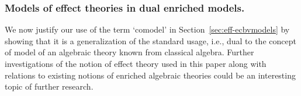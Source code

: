 \documentclass{LMCS}
\newcommand{\hide}[1]{}
\newcommand{\ECBV}{ECBV}
\newcommand{\ECBVS}[1]{\mathrm{ECBV}_{#1}^{\states}}
\newcommand{\VCat}{\fixedcatfont{V}} \newcommand{\CCat}{\fixedcatfont{C}} \newcommand{\DCat}{\fixedcatfont{D}}
\newcommand{\fixedcatfont}{\mathbf}
\newcommand{\denlb}{[\![}
\newcommand{\denrb}{]\!]}
\newcommand{\den}[1]{\denlb{#1}\denrb}
\newcommand{\stateobj}{{\underline{S}}}
\newcommand{\states}{{\underline{\mathrm{S}}}}
\newcommand{\enrmodel}{enriched call-by-value model}
\begin{document}
\hide{\begin{prop}
Let  $(\VCat,\CCat, \stateobj)$ be an {\enrmodel} with a chosen state object, and let $E$ be an effect theory. The interpretation of {\ECBV} in $(\VCat,\CCat)$ extends to a sound interpretation of $\ECBVS{E}$ with $\den\states = \stateobj$ iff $\stateobj$ carries a comodel structure for $E$.
\end{prop}}


\subsubsection{Models of effect theories in dual enriched models.}
\label{sec:eff-cpsmodels}

We now justify our use of the term `comodel' in Section~\ref{sec:eff-ecbvmodels}
by showing that it is a generalization of the standard usage, i.e., dual to the concept of 
model of an algebraic theory known from classical algebra. 
Further investigations of the notion of effect theory used in this 
paper along with relations to existing notions of enriched algebraic 
theories \cite{kp-enrichedalgtheories,p-varieties} could be an interesting topic of further research. 
\end{document}
